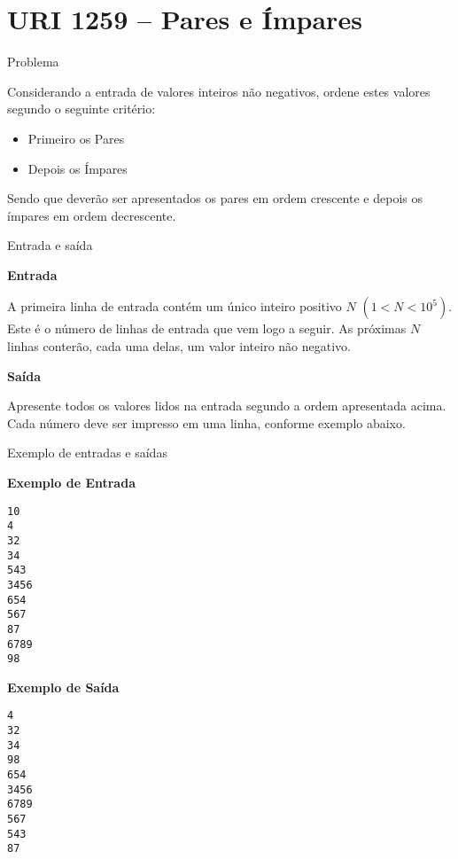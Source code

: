 \section{URI 1259 -- Pares e Ímpares}

\begin{frame}[fragile]{Problema}

Considerando a entrada de valores inteiros não negativos, ordene estes valores segundo o seguinte critério:

\begin{itemize}
    \item Primeiro os Pares
    \item Depois os Ímpares
\end{itemize}

Sendo que deverão ser apresentados os pares em ordem crescente e depois os ímpares em ordem decrescente.

\end{frame}

\begin{frame}[fragile]{Entrada e saída}

\textbf{Entrada}

A primeira linha de entrada contém um único inteiro positivo $N$ $(1 < N < 10^5)$. 
Este é o número de linhas de entrada que vem logo a seguir. As próximas $N$ linhas conterão, cada uma delas, um valor inteiro não negativo.

\vspace{0.1in}

\textbf{Saída}

Apresente todos os valores lidos na entrada segundo a ordem apresentada acima. Cada número deve ser impresso em uma linha, conforme exemplo abaixo.

\end{frame}

\begin{frame}[fragile]{Exemplo de entradas e saídas}

\begin{minipage}[t]{0.5\textwidth}
\textbf{Exemplo de Entrada}
\begin{verbatim}
10
4
32
34
543
3456
654
567
87
6789
98
\end{verbatim}
\end{minipage}
\begin{minipage}[t]{0.45\textwidth}
\textbf{Exemplo de Saída}
\begin{verbatim}
4
32
34
98
654
3456
6789
567
543
87
\end{verbatim}
\end{minipage}
\end{frame}

